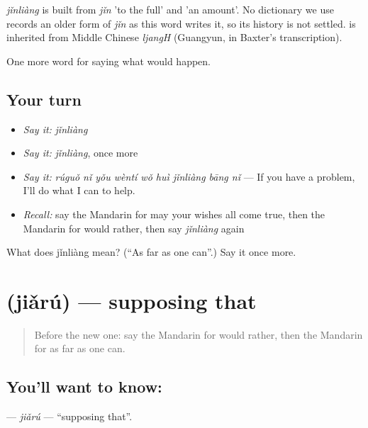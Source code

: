 \begin{cousinweb}
\emph{jǐnliàng} is built from \emph{jǐn} 'to the full' and  'an amount'. No dictionary we use records an older form of \emph{jǐn} as this word writes it, so its history is not settled.  is inherited from Middle Chinese \emph{ljangH} (Guangyun, in Baxter's transcription).
\end{cousinweb}

\begin{grammarlens}[title={What you've built}]
One more word for saying what would happen.
\end{grammarlens}

\subsection*{Your turn}
\begin{itemize}
\raggedright
  \item \emph{Say it:} \emph{jǐnliàng}
  \item \emph{Say it:} \emph{jǐnliàng}, once more
  \item \emph{Say it:} \emph{rúguǒ nǐ yǒu wèntí wǒ huì jǐnliàng bāng nǐ} — If you have a problem, I'll do what I can to help.
  \item \emph{Recall:} say the Mandarin for may your wishes all come true, then the Mandarin for would rather, then say \emph{jǐnliàng} again
\end{itemize}

\begin{tcolorbox}[breakable,colback=teal!4,colframe=teal!35!black,title={Before you move on}]
What does jǐnliàng mean? (\textquotedblleft{}As far as one can\textquotedblright{}.) Say it once more.
\end{tcolorbox}
\section[\texorpdfstring{\zh{假如} (jiǎrú)}{假如 (jiǎrú)}]{ (jiǎrú) — supposing that}

\label{lesson:ZH-C534-jiaru}



\begin{quote}
Before the new one: say the Mandarin for would rather, then the Mandarin for as far as one can.
\end{quote}

\subsection*{You'll want to know: }
\textbf{} — \emph{jiǎrú} — \textquotedblleft{}supposing that\textquotedblright{}.

